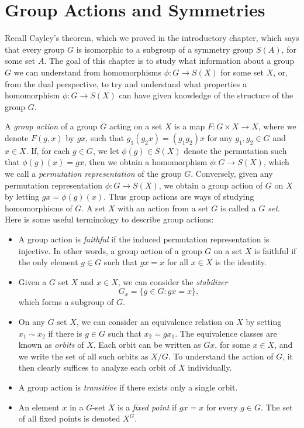 \chapter{Group Actions and Symmetries}

Recall Cayley's theorem, which we proved in the introductory chapter, which says that every group $G$ is isomorphic to a subgroup of a symmetry group $S(A)$, for some set $A$. The goal of this chapter is to study what information about a group $G$ we can understand from homomorphisms $\phi: G \to S(X)$ for some set $X$, or, from the dual perspective, to try and understand what properties a homomorphism $\phi: G \to S(X)$ can have given knowledge of the structure of the group $G$.

A \emph{group action} of a group $G$ acting on a set $X$ is a map $F:G \times X \to X$, where we denote $F(g,x)$ by $gx$, such that $g_1(g_2x) = (g_1g_2)x$ for any $g_1,g_2 \in G$ and $x \in X$. If, for each $g \in G$, we let $\phi(g) \in S(X)$ denote the permutation such that $\phi(g)(x) = gx$, then we obtain a homomorphism $\phi: G \to S(X)$, which we call a \emph{permutation representation} of the group $G$. Conversely, given any permutation representation $\phi: G \to S(X)$, we obtain a group action of $G$ on $X$ by letting $gx = \phi(g)(x)$. Thus group actions are ways of studying homomorphisms of $G$. A set $X$ with an action from a set $G$ is called a \emph{$G$ set}. Here is some useful terminology to describe group actions:
%
\begin{itemize}
    \item A group action is \emph{faithful} if the induced permutation representation is injective. In other words, a group action of a group $G$ on a set $X$ is faithful if the only element $g \in G$ such that $gx = x$ for all $x \in X$ is the identity.

    \item Given a $G$ set $X$ and $x \in X$, we can consider the \emph{stabilizer}
    \[ G_x = \{ g \in G: gx = x \}, \]
    which forms a subgroup of $G$. 

    \item On any $G$ set $X$, we can consider an equivalence relation on $X$ by setting $x_1 \sim x_2$ if there is $g \in G$ such that $x_2 = gx_1$. The equivalence classes are known as \emph{orbits} of $X$. Each orbit can be written as $Gx$, for some $x \in X$, and we write the set of all such orbits as $X/G$. To understand the action of $G$, it then clearly suffices to analyze each orbit of $X$ individually.

    \item A group action is \emph{transitive} if there exists only a single orbit.

    \item An element $x$ in a $G$-set $X$ is a \emph{fixed point} if $gx = x$ for every $g \in G$. The set of all fixed points is denoted $X^G$.
\end{itemize}

